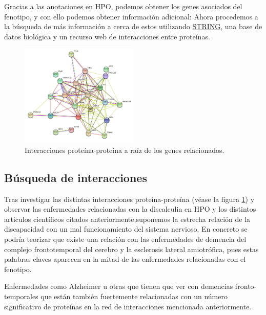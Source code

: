 \hfill

Gracias a las anotaciones en HPO, podemos obtener los genes asociados del fenotipo, y con ello podemos obtener información adicional: Ahora procedemos a la búsqueda de más información a cerca de estos utilizando \href{https://string-db.org}{STRING}, una base de datos biológica y un recurso web de interacciones entre proteínas.

\begin{figure}[b]
	\centering
	\includegraphics[width=0.50\textwidth]{figures/Gene_Relationship.png}
	\caption{Interacciones proteína-proteína a raíz de los genes relacionados. }
	\label{fig:string1}
\end{figure}


\hfill



\subsection{Búsqueda de interacciones}

Tras investigar las distintas interacciones proteína-proteína (véase la figura \ref{fig:string1}) y observar las enfermedades relacionadas con la discalculia en HPO y los distintos articulos científicos citados anteriormente,suponemos la estrecha relación de la discapacidad con un mal funcionamiento del sistema nervioso. En concreto se podría teorizar que existe una relación con las enfermedades de demencia del complejo frontotemporal del cerebro y la esclerosis lateral amiotrófica, pues estas palabras claves aparecen en la mitad de las enfermedades relacionadas con el fenotipo.

\hfill

Enfermedades como Alzheimer u otras que tienen que ver con demencias fronto-temporales \cite{Walterfang2014} que están también fuertemente relacionadas con un número significativo de proteínas en la red de interacciones mencionada anteriormente.

